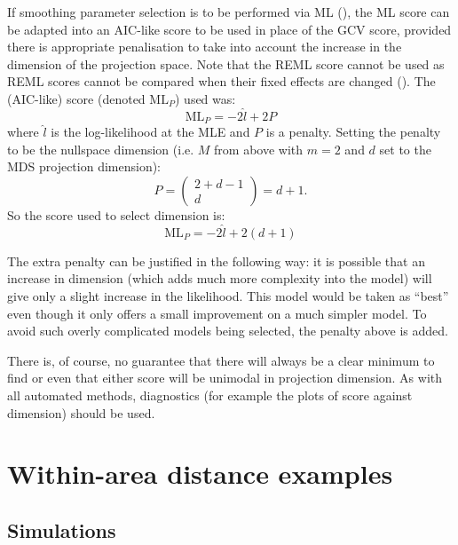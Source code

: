 If smoothing parameter selection is to be performed via ML (), the ML score can be adapted into an AIC-like score to be used in place of the GCV score, provided there is appropriate penalisation to take into account the increase in the dimension of the projection space. Note that the REML score cannot be used as REML scores cannot be compared when their fixed effects are changed (\cite{remlpaper}). The (AIC-like) score (denoted $\text{ML}_P$) used was:
\begin{equation*}
\text{ML}_P = -2 \hat{l} + 2P
\end{equation*}
where $\hat{l}$ is the log-likelihood at the MLE and $P$ is a penalty. Setting the penalty to be the nullspace dimension (i.e. $M$ from above with $m=2$ and $d$ set to the MDS projection dimension):
\begin{equation*}
P = \begin{pmatrix} 2+d-1 \\ d  \end{pmatrix} = d+1.
\end{equation*}
So the score used to select dimension is:
\begin{equation*}
\text{ML}_P = -2 \hat{l} + 2(d+1)
\end{equation*}

The extra penalty can be justified in the following way: it is possible that an increase in dimension (which adds much more complexity into the model) will give only a slight increase in the likelihood. This model would be taken as ``best'' even though it only offers a small improvement on a much simpler model. To avoid such overly complicated models being selected, the penalty above is added.

There is, of course, no guarantee that there will always be a clear minimum to find or even that either score will be unimodal in projection dimension. As with all automated methods, diagnostics (for example the plots of score against dimension) should be used.

\section{Within-area distance examples}
\label{gds-wad-examples}
\subsection{Simulations}


